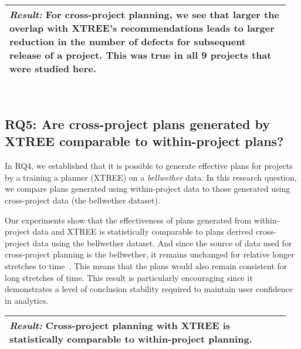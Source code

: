 \documentclass[10pt,journal,compsoc]{IEEEtran}
\begin{document}
\noindent\begin{minipage}{\linewidth}
	\begin{tabular}{|p{0.95\linewidth}|}
		\arrayrulecolor{Gray}
		\hline\vspace{-0.2cm}
		\cellcolor{Gray}\textit{\textbf{Result:}} For cross-project planning, we see 
		that larger the overlap with XTREE's recommendations leads to larger 
		reduction in the number of defects for subsequent release of a project. This 
		was true in all 9 projects that were studied here.\\\hline
	\end{tabular}
\end{minipage}\bigstrut\\[-.4cm]

\subsection*{RQ5: Are cross-project plans generated by XTREE comparable to within-project plans?}

In RQ4, we established that it is possible to generate effective plans for projects by a training a planner (XTREE) on a \textit{bellwether} data. In this research question, we compare plans generated using within-project data to those generated using cross-project data (the bellwether dataset).

Our experiments show that the effectiveness of plans generated from within-project data and XTREE is statistically comparable to plans derived cross-project data using the bellwether dataset. And since the source of data used for cross-project planning is the bellwether, it remains unchanged for relative longer stretches to time~\cite{krishna17a}. This means that the plans would also remain consistent for long stretches of time. This result is particularly encouraging since it demonstrates a level of conclusion stability required to maintain user confidence in analytics.

\noindent\begin{minipage}{\linewidth}
	\begin{tabular}{|p{0.95\linewidth}|}
		\arrayrulecolor{Gray}
		\hline\vspace{-0.2cm}
		\cellcolor{Gray}\textit{\textbf{Result:}} Cross-project planning with XTREE 
		is statistically comparable to within-project planning.\\\hline
	\end{tabular}
\end{minipage}\bigstrut%
\end{document}
